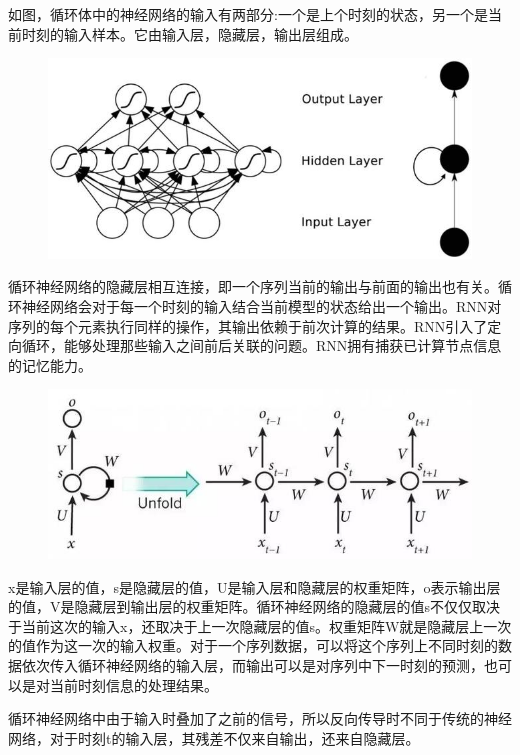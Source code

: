 \documentclass[openbib]{article}
\begin{document}
如图，循环体中的神经网络的输入有两部分:一个是上个时刻的状态，另一个是当前时刻的输入样本。它由输入层，隐藏层，输出层组成。
\begin{figure}[htbp]
	\centering
	\includegraphics[scale=0.5]{循环神经网络结构模型.jpg}
\end{figure}

循环神经网络的隐藏层相互连接，即一个序列当前的输出与前面的输出也有关。循环神经网络会对于每一个时刻的输入结合当前模型的状态给出一个输出。RNN对序列的每个元素执行同样的操作，其输出依赖于前次计算的结果。RNN引入了定向循环，能够处理那些输入之间前后关联的问题。RNN拥有捕获已计算节点信息的记忆能力。

\begin{figure}[htbp]
	\centering
	\includegraphics[scale=0.5]{循环神经网络展开图.jpg}
\end{figure}

x是输入层的值，s是隐藏层的值，U是输入层和隐藏层的权重矩阵，o表示输出层的值，V是隐藏层到输出层的权重矩阵。循环神经网络的隐藏层的值s不仅仅取决于当前这次的输入x，还取决于上一次隐藏层的值s。权重矩阵W就是隐藏层上一次的值作为这一次的输入权重。对于一个序列数据，可以将这个序列上不同时刻的数据依次传入循环神经网络的输入层，而输出可以是对序列中下一时刻的预测，也可以是对当前时刻信息的处理结果。

循环神经网络中由于输入时叠加了之前的信号，所以反向传导时不同于传统的神经网络，对于时刻t的输入层，其残差不仅来自输出，还来自隐藏层。
\end{document}
